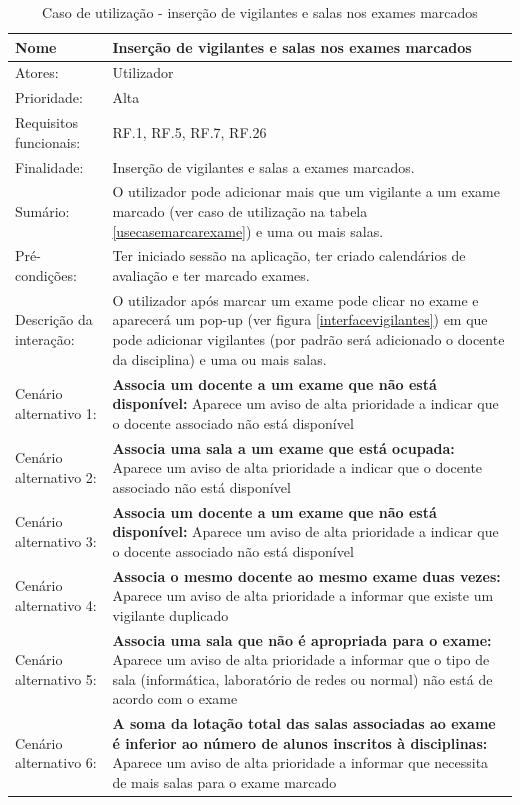 \documentclass[11pt, twoside]{report}
\begin{document}
	
\def\arraystretch{1.5}
\begin{center}
	\begin{longtable}{|m{4cm}|m{12cm}|}
	\caption{Caso de utilização - inserção de vigilantes e salas nos exames marcados}\\
		
		\hline
	\textbf{Nome }	& \textbf{Inserção de vigilantes e salas nos exames marcados} \\
	\hline
	Atores: & Utilizador\\
	\hline
	Prioridade: &  Alta\\
	\hline
	Requisitos funcionais:& RF.1, RF.5, RF.7, RF.26 \\
	\hline
	Finalidade: & Inserção de vigilantes e salas a exames marcados.\\
	\hline
	Sumário: & O utilizador pode adicionar mais que um vigilante a um exame marcado (ver caso de utilização na tabela \ref{usecasemarcarexame}) e uma ou mais salas.\\
	\hline
	Pré-condições: & Ter iniciado sessão na aplicação, ter criado calendários de avaliação e ter marcado exames.\\
	\hline 
	Descrição da interação: & O utilizador após marcar um exame pode clicar no exame e aparecerá um pop-up (ver figura \ref{interfacevigilantes}) em que pode adicionar vigilantes (por padrão será adicionado o docente da disciplina) e uma ou mais salas. \\
	\hline
	Cenário alternativo 1: & \textbf{Associa um docente a um exame que não está disponível:} Aparece um aviso de alta prioridade a indicar que o docente associado não está disponível\\
	\hline
	Cenário alternativo 2: & \textbf{Associa uma sala a um exame que está ocupada:} Aparece um aviso de alta prioridade a indicar que o docente associado não está disponível\\
	\hline
	Cenário alternativo 3: & \textbf{Associa um docente a um exame que não está disponível:} Aparece um aviso de alta prioridade a indicar que o docente associado não está disponível\\
	\hline
	Cenário alternativo 4: & \textbf{Associa o mesmo docente ao mesmo exame duas vezes:} Aparece um aviso de alta prioridade a informar que existe um vigilante duplicado\\
	\hline
	Cenário alternativo 5: & \textbf{Associa uma sala que não é apropriada para o exame:} Aparece um aviso de alta prioridade a informar que o tipo de sala (informática, laboratório de redes ou normal) não está de acordo com o exame\\
	\hline
	Cenário alternativo 6: & \textbf{A soma da lotação total das salas associadas ao exame é inferior ao número de alunos inscritos à disciplinas:} Aparece um aviso de alta prioridade a informar que necessita de mais salas para o exame marcado\\
	\hline
	\end{longtable}
\end{center}
\end{document}
